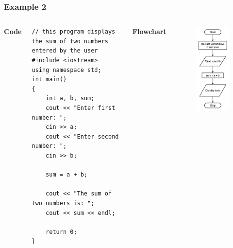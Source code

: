 \documentclass{beamer}
\begin{document}
\begin{frame}[fragile]
    \frametitle{Example 2}
    \begin{columns}
    \textbf{Code}
    \lstset{style=mystyle}
    \begin{lstlisting}
// this program displays the sum of two numbers entered by the user
#include <iostream>
using namespace std;
int main()
{
    int a, b, sum;
    cout << "Enter first number: ";
    cin >> a;
    cout << "Enter second number: ";
    cin >> b;

    sum = a + b;

    cout << "The sum of two numbers is: ";
    cout << sum << endl;

    return 0;
}\end{lstlisting}
    \textbf{Flowchart}
    \begin{figure}
        \centering
        \includegraphics[scale=0.55]{p2flow}
    \end{figure}
    \end{columns}
\end{frame}
\end{document}
